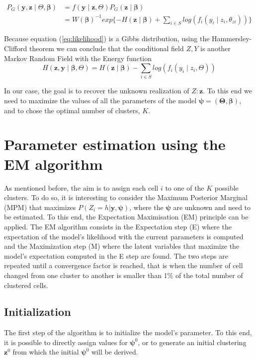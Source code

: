 \begin{align}
\label{eq:likelihood}
P_G(\boldsymbol{y},\boldsymbol{z} \mid \Theta, \boldsymbol{\beta}) &= f(\boldsymbol{y} \mid \boldsymbol{z}, \Theta)P_G(\boldsymbol{z} \mid \boldsymbol{\beta})\nonumber\\
&= W(\boldsymbol{\beta})^{-1}exp\{{-H(\boldsymbol{z} \mid \boldsymbol{\beta})} + \sum\limits_{i \in S}log(f_i(y_i \mid z_i, \theta_{zi}))\}
\end{align}

Because equation (\ref{eq:likelihood}) is a Gibbs distribution, using the Hammersley-Clifford theorem we can conclude that the conditional field $Z, Y$ is another Markov Random Field with the Energy function 
\[H(\boldsymbol{z}, \boldsymbol{y} \mid \boldsymbol{\beta}, \Theta) = H(\boldsymbol{z} \mid \boldsymbol{\beta}) - \sum\limits_{i \in S} log(f_i(y_i \mid z_i, \Theta))\]

In our case, the goal is to recover the unknown realization of $Z: \boldsymbol{z}$. To this end we need to maximize the values of all the parameters of the model $\boldsymbol{\psi} = (\boldsymbol{\Theta}, \boldsymbol{\beta})$, and to chose the optimal number of clusters, $K$.

\section{Parameter estimation using the EM algorithm}
As mentioned before, the aim is to assign each cell $i$ to one of the $K$ possible clusters. To do so, it is interesting to consider the Maximum Posterior Marginal (MPM) that maximizes $P(Z_{i}=h|\boldsymbol{y}, \boldsymbol{\psi})$, where the $\boldsymbol{\psi}$ are unknown and need to be estimated. To this end, the Expectation Maximisation \citep{dempster77} (EM) principle can be applied. The EM algorithm consists in the Expectation step (E) where the expectation of the model's likelihood with the current parameters is computed and the Maximization step (M) where the latent variables that maximize the model's expectation computed in the E step are found. The two steps are repeated until a convergence factor is reached, that is when the number of cell changed from one cluster to another is smaller than 1\% of the total number of clustered cells.\\

	\subsection{Initialization}
The first step of the algorithm is to initialize the model's parameter. To this end, it is possible to directly assign values for $\boldsymbol{\psi}^{0}$, or to generate an initial clustering $\boldsymbol{z}^{0}$ from which the initial $\boldsymbol{\psi}^{0}$ will be derived.\\

